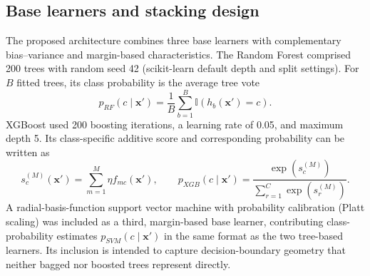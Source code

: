 \documentclass{elektr}
\begin{document}
\subsection{Base learners and stacking design}
The proposed architecture combines three base learners with complementary bias--variance and margin-based characteristics. The Random Forest comprised 200 trees with random seed 42 (scikit-learn default depth and split settings). For $B$ fitted trees, its class probability is the average tree vote
\begin{equation}
p_{RF}(c\mid\mathbf{x}')=\frac{1}{B}\sum_{b=1}^{B}
\mathbb{I}\!\left(h_b(\mathbf{x}')=c\right).
\label{eq:rf}
\end{equation}
XGBoost used 200 boosting iterations, a learning rate of 0.05, and maximum depth 5. Its class-specific additive score and corresponding probability can be written as
\begin{equation}
s_c^{(M)}(\mathbf{x}')=\sum_{m=1}^{M}\eta f_{mc}(\mathbf{x}'),
\qquad
p_{XGB}(c\mid\mathbf{x}')=
\frac{\exp(s_c^{(M)})}{\sum_{r=1}^{C}\exp(s_r^{(M)})}.
\label{eq:xgb}
\end{equation}
A radial-basis-function support vector machine with probability calibration (Platt scaling) was included as a third, margin-based base learner, contributing class-probability estimates $p_{SVM}(c\mid\mathbf{x}')$ in the same format as the two tree-based learners. Its inclusion is intended to capture decision-boundary geometry that neither bagged nor boosted trees represent directly.
\end{document}
